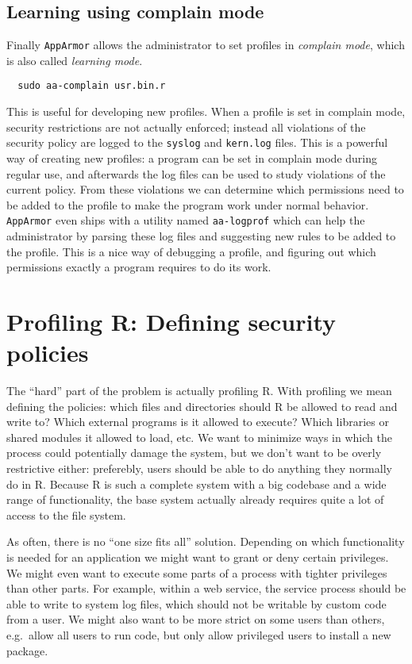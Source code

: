 \documentclass{jss}
\newcommand{\R}{\textsf{R}\xspace}
\newcommand{\AppArmor}{\texttt{AppArmor}\xspace}
\begin{document}
\subsection{Learning using complain mode}

Finally \AppArmor allows the administrator to set profiles in \emph{complain
mode}, which is also called \emph{learning mode}.
\begin{verbatim}
  sudo aa-complain usr.bin.r
\end{verbatim}
This is useful for developing new profiles. When a profile is set in complain
mode, security restrictions are not actually enforced; instead all violations
of the security policy are logged to the \texttt{syslog} and \texttt{kern.log}
files. This is a powerful way of creating new profiles: a program can be set in
complain mode during regular use, and afterwards the log files can be used to
study violations of the current policy. From these violations we can determine
which permissions need to be added to the profile to make the program work
under normal behavior. \AppArmor even ships with a utility named
\texttt{aa-logprof} which can help the administrator by parsing these log files and
suggesting new rules to be added to the profile. This is a nice way of
debugging a profile, and figuring out which permissions exactly a program
requires to do its work.

\section[Profiling R: Defining security policies]{Profiling \R: Defining
security policies}

The ``hard'' part of the problem is actually profiling \R. With
profiling we mean defining the policies: which files and directories should
\R be allowed to read and write to? Which external programs is it
allowed to execute? Which libraries or shared modules it allowed to load, etc.
We want to minimize ways in which the process could potentially damage the
system, but we don't want to be overly restrictive either: preferebly, users
should be able to do anything they normally do in \R. Because \R is
such a complete system with a big codebase and a wide range of functionality,
the base system actually already requires quite a lot of access to the file
system.

As often, there is no ``one size fits all'' solution. Depending on which
functionality is needed for an application we might want to grant or deny
certain privileges. We might even want to execute some parts of a process with
tighter privileges than other parts. For example, within a web service, the
service process should be able to write to system log files, which should not be
writable by custom code from a user. We might also want to be more strict on
some users than others, e.g.\ allow all users to run code, but only allow
privileged users to install a new package.
\end{document}
